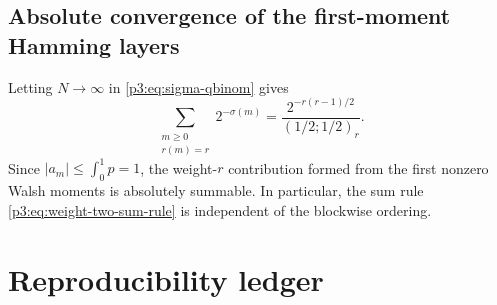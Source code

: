 \documentclass[11pt]{article}
\theoremstyle{definition}
\theoremstyle{remark}
\begin{document}
\subsection{Absolute convergence of the first-moment Hamming layers}

Letting $N\to\infty$ in \eqref{p3:eq:sigma-qbinom} gives
\begin{equation}\label{p3:eq:infinite-Hamming-sigma}
 \sum_{\substack{m\ge0\\r(m)=r}}2^{-\sigma(m)}
 =\frac{2^{-r(r-1)/2}}{(1/2;1/2)_r}.
\end{equation}
Since $|a_m|\le\int_0^1p=1$, the weight-$r$ contribution formed from the first
nonzero Walsh moments is absolutely summable.  In particular, the sum rule
\eqref{p3:eq:weight-two-sum-rule} is independent of the blockwise ordering.

\section{Reproducibility ledger}
\label{p3:app:ledger}


\end{document}
